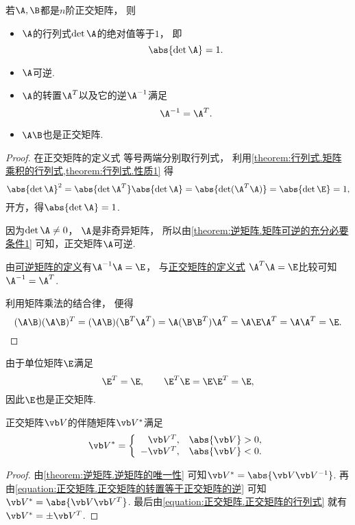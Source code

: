 \begin{property}
若\(\A,\B\)都是\(n\)阶正交矩阵，
则\begin{itemize}
	\item \(\A\)的行列式\(\det\A\)的绝对值等于\(1\)，
	即\begin{equation}\label{equation:正交矩阵.正交矩阵的行列式}
		\abs{\det\A}=1.
	\end{equation}

	\item \(\A\)可逆.

	\item \(\A\)的转置\(\A^T\)以及它的逆\(\A^{-1}\)满足
	\begin{equation}\label{equation:正交矩阵.正交矩阵的转置等于正交矩阵的逆}
		\A^{-1}=\A^T.
	\end{equation}

	\item \(\A\B\)也是正交矩阵.
\end{itemize}
\begin{proof}
在正交矩阵的定义式  等号两端分别取行列式，
利用\cref{theorem:行列式.矩阵乘积的行列式,theorem:行列式.性质1} 得\[
	\abs{\det\A}^2
	=\abs{\det\A^T} \abs{\det\A\vphantom{^T}}
	=\abs{\det(\A^T \A)}
	=\abs{\det\E}
	=1,
\]
开方，得\(\abs{\det\A}=1\).

因为\(\det\A\neq0\)，
\(\A\)是非奇异矩阵，
所以由\cref{theorem:逆矩阵.矩阵可逆的充分必要条件1} 可知，正交矩阵\(\A\)可逆.

由\hyperref[definition:可逆矩阵.可逆矩阵的定义]{可逆矩阵的定义}有\(\A^{-1}\A=\E\)，
与\hyperref[equation:正交矩阵.正交矩阵的定义式]{正交矩阵的定义式}
\(\A^T\A=\E\)比较可知\(\A^{-1}=\A^T\).

利用矩阵乘法的结合律，
便得\[
	(\A\B)(\A\B)^T
	= (\A\B)(\B^T\A^T)
	= \A(\B\B^T)\A^T
	= \A\E\A^T
	= \A\A^T
	= \E.
	\qedhere
\]
\end{proof}
\end{property}

\begin{example}
由于单位矩阵\(\E\)满足\[
	\E^T=\E, \qquad
	\E^T \E = \E \E^T = \E,
\]
因此\(\E\)也是正交矩阵.
\end{example}

\begin{proposition}
正交矩阵\(\Q\)的伴随矩阵\(\Q^*\)满足\[
	\Q^*
	= \left\{ \begin{array}{rc}
		\Q^T, & \abs{\Q}>0, \\
		-\Q^T, & \abs{\Q}<0.
	\end{array} \right.
\]
\begin{proof}
由\cref{theorem:逆矩阵.逆矩阵的唯一性}
可知\(\Q^* = \abs{\Q \Q^{-1}}\).
再由\cref{equation:正交矩阵.正交矩阵的转置等于正交矩阵的逆}
可知\(\Q^* = \abs{\Q \Q^T}\).
最后由\cref{equation:正交矩阵.正交矩阵的行列式}
就有\(\Q^* = \pm\Q^T\).
\end{proof}
\end{proposition}

